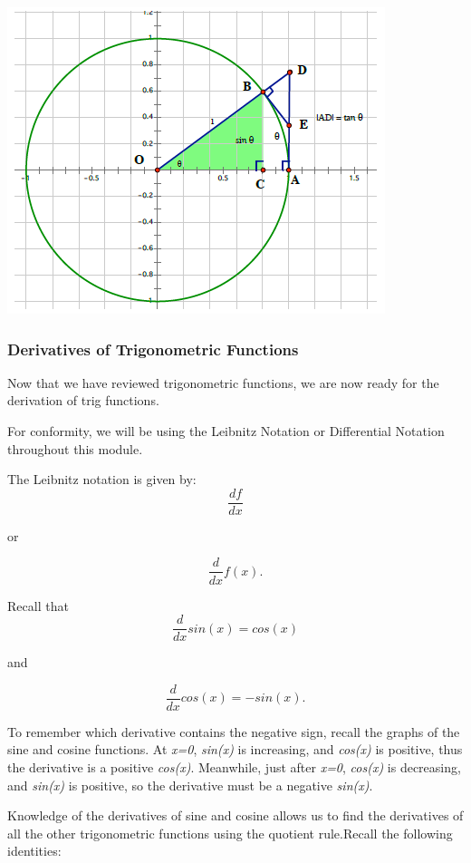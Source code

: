 \documentclass[
  letterpaper,
  DIV=11,
  numbers=noendperiod]{scrartcl}
\begin{document}
\begin{center}
\includegraphics{clipboard-2032292710.png}
\end{center}

\subsubsection{Derivatives of Trigonometric
Functions}\label{derivatives-of-trigonometric-functions-1}

Now that we have reviewed trigonometric functions, we are now ready for
the derivation of trig functions.

For conformity, we will be using the Leibnitz Notation or Differential
Notation throughout this module.

The Leibnitz notation is given by: \[
\frac{df}{dx}
\]

or

\[
\frac{d}{dx}f(x) .
\]

Recall that \[
\frac{d}{dx}sin(x) = cos(x)
\]

and

\[
 \frac{d}{dx}cos(x)=-sin(x).
 \]

To remember which derivative contains the negative sign, recall the
graphs of the sine and cosine functions. At \emph{x=0}, \emph{sin(x)} is
increasing, and \emph{cos(x)} is positive, thus the derivative is a
positive \emph{cos(x)}. Meanwhile, just after \emph{x=0}, \emph{cos(x)}
is decreasing, and \emph{sin(x)} is positive, so the derivative must be
a negative \emph{sin(x)}.

Knowledge of the derivatives of sine and cosine allows us to find the
derivatives of all the other trigonometric functions using the quotient
rule.Recall the following identities:
\end{document}
